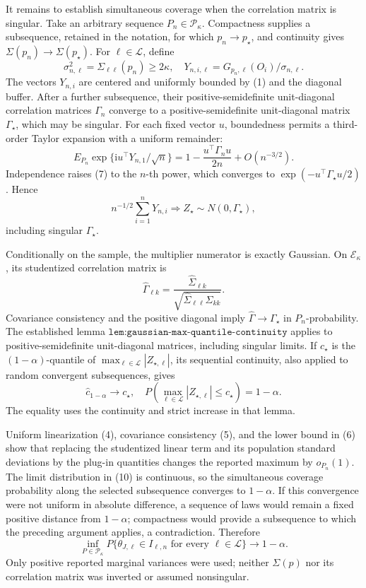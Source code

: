 It remains to establish simultaneous coverage when the correlation matrix is singular.  Take an arbitrary sequence \(P_n\in\mathcal P_\kappa\).  Compactness supplies a subsequence, retained in the notation, for which \(p_n\to p_\star\), and continuity gives \(\Sigma(p_n)\to\Sigma(p_\star)\).  For \(\ell\in\mathcal L\), define
\[
 \sigma_{n,\ell}^2=\Sigma_{\ell\ell}(p_n)\geq2\kappa,
 \quad
 Y_{n,i,\ell}=G_{p_n,\ell}(O_i)/\sigma_{n,\ell}.
\tag{6}
\]
The vectors \(Y_{n,i}\) are centered and uniformly bounded by (1) and the diagonal buffer.  After a further subsequence, their positive-semidefinite unit-diagonal correlation matrices \(\Gamma_n\) converge to a positive-semidefinite unit-diagonal matrix \(\Gamma_\star\), which may be singular.  For each fixed vector \(u\), boundedness permits a third-order Taylor expansion with a uniform remainder:
\[
 E_{P_n}\exp\{\mathrm i u^\top Y_{n,1}/\sqrt n\}
 =1-\frac{u^\top\Gamma_nu}{2n}+O(n^{-3/2}).
\tag{7}
\]
Independence raises (7) to the \(n\)-th power, which converges to \(\exp(-u^\top\Gamma_\star u/2)\).  Hence
\[
 n^{-1/2}\sum_{i=1}^nY_{n,i}
 \Longrightarrow Z_\star\sim N(0,\Gamma_\star),
\tag{8}
\]
including singular \(\Gamma_\star\).

Conditionally on the sample, the multiplier numerator is exactly Gaussian.  On \(\mathcal E_\kappa\), its studentized correlation matrix is
\[
 \widehat\Gamma_{\ell k}
 =\frac{\widehat\Sigma_{\ell k}}
 {\sqrt{\widehat\Sigma_{\ell\ell}\widehat\Sigma_{kk}}}.
\tag{9}
\]
Covariance consistency and the positive diagonal imply \(\widehat\Gamma\to\Gamma_\star\) in \(P_n\)-probability.  The established lemma \(\texttt{lem:gaussian-max-quantile-continuity}\) applies to positive-semidefinite unit-diagonal matrices, including singular limits.  If \(c_\star\) is the \((1-\alpha)\)-quantile of \(\max_{\ell\in\mathcal L}|Z_{\star,\ell}|\), its sequential continuity, also applied to random convergent subsequences, gives
\[
 \widehat c_{1-\alpha}\to c_\star,
 \quad
 P\!\left(\max_{\ell\in\mathcal L}|Z_{\star,\ell}|\leq c_\star\right)
 =1-\alpha.
\tag{10}
\]
The equality uses the continuity and strict increase in that lemma.

Uniform linearization (4), covariance consistency (5), and the lower bound in (6) show that replacing the studentized linear term and its population standard deviations by the plug-in quantities changes the reported maximum by \(o_{P_n}(1)\).  The limit distribution in (10) is continuous, so the simultaneous coverage probability along the selected subsequence converges to \(1-\alpha\).  If this convergence were not uniform in absolute difference, a sequence of laws would remain a fixed positive distance from \(1-\alpha\); compactness would provide a subsequence to which the preceding argument applies, a contradiction.  Therefore
\[
 \inf_{P\in\mathcal P_\kappa}
 P\{\theta_{J,\ell}\in I_{\ell,n}\text{ for every }\ell\in\mathcal L\}
 \longrightarrow1-\alpha.
\tag{11}
\]
Only positive reported marginal variances were used; neither \(\Sigma(p)\) nor its correlation matrix was inverted or assumed nonsingular.

